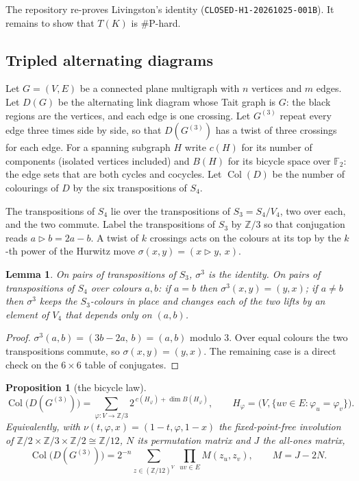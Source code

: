 \documentclass[11pt]{article}
\newtheorem{lemma}[theorem]{Lemma}
\newtheorem{proposition}[theorem]{Proposition}
\theoremstyle{definition}
\theoremstyle{remark}
\newcommand{\F}{\mathbb{F}}
\newcommand{\Z}{\mathbb{Z}}
\newcommand{\Col}{\operatorname{Col}}
\newcommand{\sharpP}{\#\mathrm{P}}
\begin{document}
The repository re-proves Livingston's identity
(\texttt{CLOSED-H1-20261025-001B}). It remains to show that $T(K)$ is
$\sharpP$-hard.

\subsection{Tripled alternating diagrams}

Let $G=(V,E)$ be a connected plane multigraph with $n$ vertices and $m$ edges.
Let $D(G)$ be the alternating link diagram whose Tait graph is $G$: the black
regions are the vertices, and each edge is one crossing. Let $G^{(3)}$ repeat
every edge three times side by side, so that $D(G^{(3)})$ has a twist of three
crossings for each edge. For a spanning subgraph $H$ write $c(H)$ for its
number of components (isolated vertices included) and $B(H)$ for its bicycle
space over $\F_2$: the edge sets that are both cycles and cocycles. Let
$\Col(D)$ be the number of colourings of $D$ by the six transpositions of
$S_4$.

The transpositions of $S_4$ lie over the transpositions of $S_3=S_4/V_4$, two
over each, and the two commute. Label the transpositions of $S_3$ by $\Z/3$ so
that conjugation reads $a\triangleright b=2a-b$. A twist of $k$ crossings acts
on the colours at its top by the $k$-th power of the Hurwitz move
$\sigma(x,y)=(x\triangleright y,\,x)$.

\begin{lemma}\label{lem:twist}
On pairs of transpositions of $S_3$, $\sigma^3$ is the identity. On pairs of
transpositions of $S_4$ over colours $a,b$: if $a=b$ then
$\sigma^3(x,y)=(y,x)$; if $a\ne b$ then $\sigma^3$ keeps the $S_3$-colours in
place and changes each of the two lifts by an element of $V_4$ that depends
only on $(a,b)$.
\end{lemma}

\begin{proof}
$\sigma^3(a,b)=(3b-2a,\,b)=(a,b)$ modulo $3$. Over equal colours the two
transpositions commute, so $\sigma(x,y)=(y,x)$. The remaining case is a
direct check on the $6\times6$ table of conjugates.
\end{proof}

\begin{proposition}[the bicycle law]\label{prop:bicycle}
\[
\Col\bigl(D(G^{(3)})\bigr)=\sum_{\varphi\colon V\to\Z/3}2^{\,c(H_\varphi)+\dim
B(H_\varphi)},\qquad H_\varphi=\bigl(V,\{uv\in E:\varphi_u=\varphi_v\}\bigr).
\]
Equivalently, with $\nu(t,\varphi,x)=(1-t,\varphi,1-x)$ the fixed-point-free
involution of $\Z/2\times\Z/3\times\Z/2\cong\Z/12$, $N$ its permutation matrix
and $J$ the all-ones matrix,
\[
\Col\bigl(D(G^{(3)})\bigr)=2^{-n}\sum_{z\in(\Z/12)^V}\ \prod_{uv\in
E}M(z_u,z_v),\qquad M=J-2N .
\]
\end{proposition}
\end{document}
